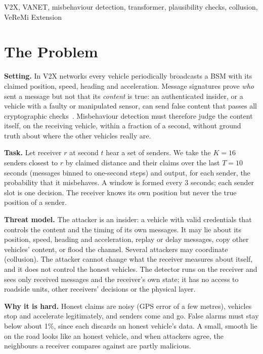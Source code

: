\documentclass[conference]{IEEEtran}
\begin{document}
\begin{IEEEkeywords}
V2X, VANET, misbehaviour detection, transformer, plausibility checks, collusion, VeReMi Extension
\end{IEEEkeywords}

\section{The Problem}
\label{sec:problem}
\textbf{Setting.} In V2X networks every vehicle periodically broadcasts a BSM with its claimed position, speed, heading and acceleration.
Message signatures prove \emph{who} sent a message but not that its \emph{content} is true: an authenticated insider, or a vehicle with a faulty or
manipulated sensor, can send false content that passes all cryptographic checks~\cite{ruj2011, boualouache2022}. Misbehaviour detection must therefore
judge the content itself, on the receiving vehicle, within a fraction of a second, without ground truth about where the other vehicles really are.

\textbf{Task.} Let receiver $r$ at second $t$ hear a set of senders. We take the $K{=}16$ senders closest to $r$ by claimed distance and their
claims over the last $T{=}10$ seconds (messages binned to one-second steps) and output, for each sender, the probability that it misbehaves. A window
is formed every 3 seconds; each sender slot is one decision. The receiver knows its own position but never the true position of a sender.

\textbf{Threat model.} The attacker is an insider: a vehicle with valid credentials that controls the content and the timing of its own
messages. It may lie about its position, speed, heading and acceleration, replay or delay messages, copy other vehicles' content, or flood the
channel. Several attackers may coordinate (collusion). The attacker cannot change what the receiver measures about itself, and it does not
control the honest vehicles. The detector runs on the receiver and sees only received messages and the receiver's own state; it has no access to
roadside units, other receivers' decisions or the physical layer.

\textbf{Why it is hard.} Honest claims are noisy (GPS error of a few metres), vehicles stop and accelerate legitimately, and senders come and go.
False alarms must stay below about 1\%, since each discards an honest vehicle's data. A small, smooth lie on the road looks like an honest
vehicle, and when attackers agree, the neighbours a receiver compares against are partly malicious.
\end{document}
